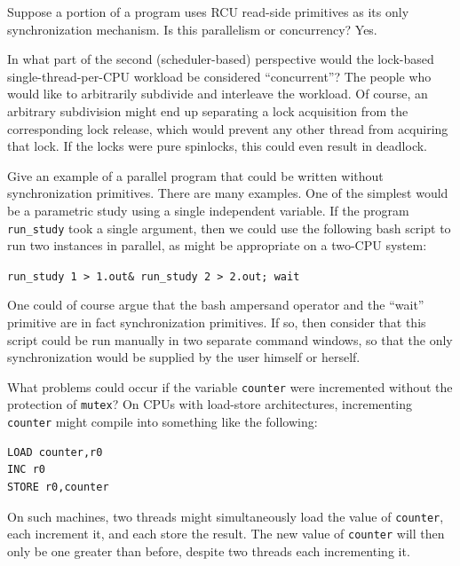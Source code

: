 \begin{enumerate}
\QuickQ{}
	Suppose a portion of a program uses RCU read-side primitives
	as its only synchronization mechanism.
	Is this parallelism or concurrency?
\QuickA{}
	Yes.

\QuickQ{}
	In what part of the second (scheduler-based) perspective would
	the lock-based single-thread-per-CPU workload be considered
	``concurrent''?
\QuickA{}
	The people who would like to arbitrarily subdivide and interleave
	the workload.
	Of course, an arbitrary subdivision might end up separating
	a lock acquisition from the corresponding lock release, which
	would prevent any other thread from acquiring that lock.
	If the locks were pure spinlocks, this could even result in
	deadlock.

\QuickQ{}
	Give an example of a parallel program that could be written
	without synchronization primitives.
\QuickA{}
	There are many examples.
	One of the simplest would be a parametric study using a
	single independent variable.
	If the program {\tt run\_study} took a single argument,
	then we could use the following bash script to run two
	instances in parallel, as might be appropriate on a
	two-CPU system:

	{ \scriptsize \tt run\_study 1 > 1.out\& run\_study 2 > 2.out; wait}

	One could of course argue that the bash ampersand operator and
	the ``wait'' primitive are in fact synchronization primitives.
	If so, then consider that
	this script could be run manually in two separate
	command windows, so that the only synchronization would be
	supplied by the user himself or herself.

\QuickQ{}
	What problems could occur if the variable {\tt counter} were
	incremented without the protection of {\tt mutex}?
\QuickA{}
	On CPUs with load-store architectures, incrementing {\tt counter}
	might compile into something like the following:

\vspace{5pt}
\begin{minipage}[t]{\columnwidth}
\small
\begin{verbatim}
LOAD counter,r0
INC r0
STORE r0,counter
\end{verbatim}
\end{minipage}
\vspace{5pt}

	On such machines, two threads might simultaneously load the
	value of {\tt counter}, each increment it, and each store the
	result.
	The new value of {\tt counter} will then only be one greater
	than before, despite two threads each incrementing it.


\end{enumerate}
